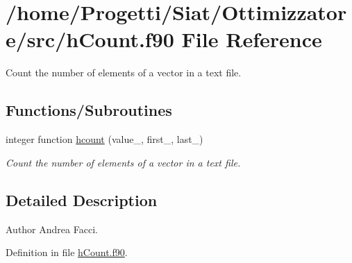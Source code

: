\hypertarget{h_count_8f90}{\section{/home/\-Progetti/\-Siat/\-Ottimizzatore/src/h\-Count.f90 File Reference}
\label{h_count_8f90}
}


Count the number of elements of a vector in a text file.  


\subsection*{Functions/\-Subroutines}
\begin{DoxyCompactItemize}
\item 
integer function \hyperlink{h_count_8f90_aabd14fa726542746b1102412257a55c6}{hcount} (value\-\_\-, first\-\_\-, last\-\_\-)
\begin{DoxyCompactList}\small\item\em Count the number of elements of a vector in a text file. \end{DoxyCompactList}\end{DoxyCompactItemize}


\subsection{Detailed Description}
\begin{DoxyAuthor}{Author}
Andrea Facci. 
\end{DoxyAuthor}


Definition in file \hyperlink{h_count_8f90_source}{h\-Count.\-f90}.



